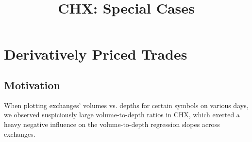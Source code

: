 \documentclass{article}
\begin{document}
\title{CHX: Special Cases}

\maketitle
\vspace{.5pc}

\section{Derivatively Priced Trades}
\subsection{Motivation}
When plotting exchanges' volumes vs. depths for certain symbols on various days, we observed suspiciously large volume-to-depth ratios in CHX, which exerted a heavy negative influence on the volume-to-depth regression slopes across exchanges.\\
\end{document}
